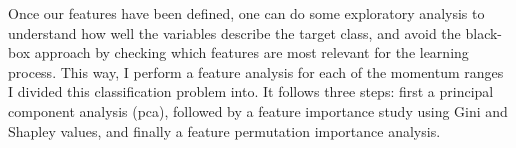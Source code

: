 Once our features have been defined, one can do some exploratory analysis to understand how well the variables describe the target class, and avoid the black-box approach by checking which features are most relevant for the learning process. This way, I perform a feature analysis for each of the momentum ranges I divided this classification problem into. It follows three steps: first a principal component analysis (\gls{pca}), followed by a feature importance study using Gini \cite{Jost2006} and Shapley \cite{Shapley1951} values, and finally a feature permutation importance analysis.

